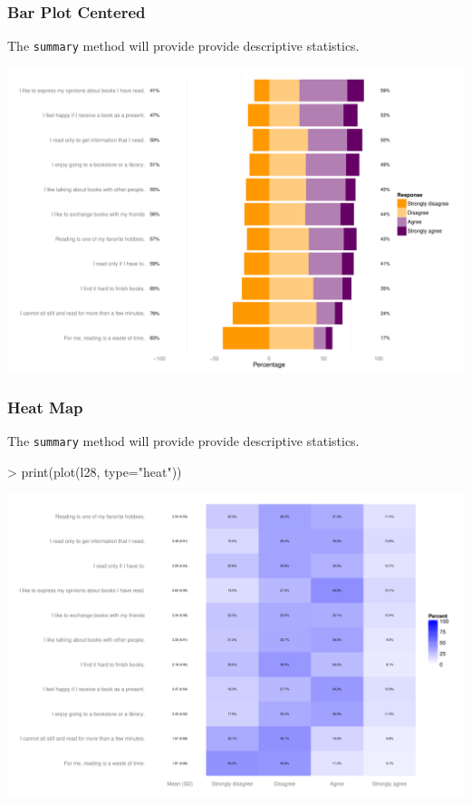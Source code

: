 \documentclass[10pt,slidestop,mathserif,c]{beamer}
\begin{document}
\begin{frame}
	\frametitle{Bar Plot Centered}
    The \texttt{summary} method will provide provide descriptive statistics.
    
\begin{Schunk}
\end{Schunk}
\includegraphics{Slides-likert-bar-centered}
\end{frame}

\begin{frame}
	\frametitle{Heat Map}
    The \texttt{summary} method will provide provide descriptive statistics.
    
\begin{Schunk}
\begin{Sinput}
> print(plot(l28, type="heat"))
\end{Sinput}
\end{Schunk}
\includegraphics{Slides-likert-heat}
\end{frame}


\end{document}
